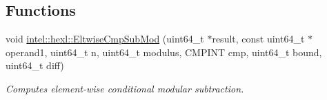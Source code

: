 \subsection*{Functions}
\begin{DoxyCompactItemize}
\item 
void \hyperlink{namespaceintel_1_1hexl_a78bf86d32140e39d8f99d474ccd0e226}{intel\+::hexl\+::\+Eltwise\+Cmp\+Sub\+Mod} (uint64\+\_\+t $\ast$result, const uint64\+\_\+t $\ast$operand1, uint64\+\_\+t n, uint64\+\_\+t modulus, C\+M\+P\+I\+NT cmp, uint64\+\_\+t bound, uint64\+\_\+t diff)
\begin{DoxyCompactList}\small\item\em Computes element-\/wise conditional modular subtraction. \end{DoxyCompactList}\end{DoxyCompactItemize}

